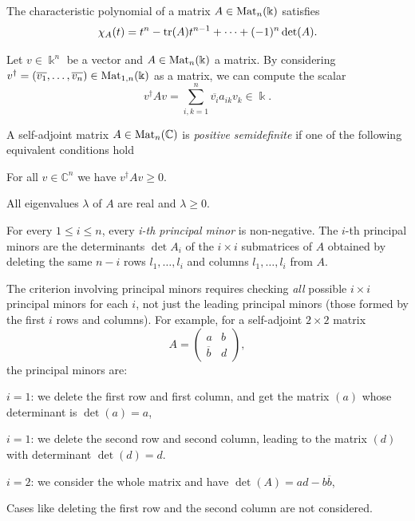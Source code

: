 \documentclass[a4paper, oneside, 12pt]{amsart}
\begin{document}
\begin{proposition}\label{prop:coeffs-of-char-poly}
  The characteristic polynomial of a matrix \(A \in \operatorname{Mat}_{n}( \Bbbk)\) satisfies
  \begin{equation}
    \chi_{A}(t) = t^{n} - \operatorname{tr}(A)t^{n-1} + \dots + (-1)^{n}\det(A).
  \end{equation}
\end{proposition}
Let \(v\in \Bbbk^{n}\) be a vector and \(A \in \operatorname{Mat}_{n}( \Bbbk)\) a matrix.
By considering \(v^{\dagger}= (\overline{v_{1}}, \dots , \overline{v_{n}})\in \operatorname{Mat}_{1,n}( \Bbbk)\) as a matrix, we can compute the scalar
\begin{equation*}
  v^{\dagger}Av =\sum_{i,k=1}^{n} \overline{v_{i}}a_{ik}v_{k} \in \Bbbk.
\end{equation*}

\begin{definition}\label{def:positive-semidefinite}
  A self-adjoint matrix \(A\in \operatorname{Mat}_{n}( \mathbb{C})\) is \emph{positive semidefinite} if one of the following equivalent conditions hold
  \begin{thmlist}
    \item For all \(v\in \mathbb{C}^{n}\) we have \(v^{\dagger}Av \geq 0\).
    \item All eigenvalues \(\lambda\) of \(A\) are real and \(\lambda \geq 0\).
    \item For every \(1\leq i\leq n\), every \emph{i-th principal minor} is non-negative.
    The \(i\)-th principal minors are the determinants \(\det A_{i}\) of  the \( i \times i \) submatrices of \(A\) obtained by deleting the same \( n-i \) rows \(l_{1}, \dots , l_{i}\) and columns \(l_{1}, \dots , l_{i}\) from \( A \).
  \end{thmlist}
\end{definition}
The criterion involving principal minors requires checking \emph{all} possible \( i \times i \) principal minors for each \( i \), not just the leading principal minors (those formed by the first \( i \) rows and columns).
For example, for a self-adjoint \( 2 \times 2 \) matrix
\begin{equation*}
  A = \begin{pmatrix}
    a & b \\
    \overline{b} & d
  \end{pmatrix},
\end{equation*}
the principal minors are:
\begin{thmlist}
\item \( i = 1 \): we delete the first row and first column, and get the matrix \((a)\) whose determinant is \( \det(a)=a \),
\item \( i = 1 \): we delete the second row and second column, leading to the matrix \((d)\) with  determinant \( \det(d)=d\).
\item \( i = 2 \): we consider the whole matrix and have \( \det(A) = ad - b\overline{b} \),
\end{thmlist}
Cases like deleting the first row and the second column are not considered.
\bigskip
\end{document}
